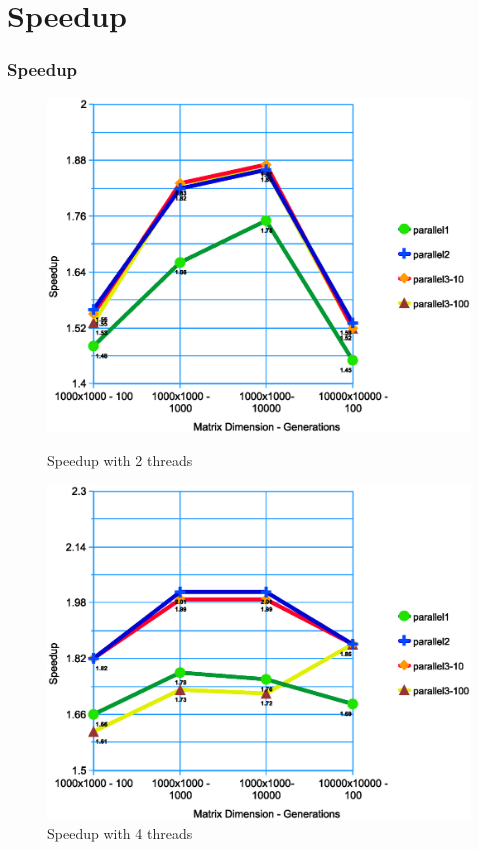 \documentclass{beamer}
\begin{document}
\section{Speedup}
\begin{frame}
	\frametitle{Speedup}
	\begin{figure}
		\centering
		\begin{minipage}{0.5\textwidth}
			\centering
			\includegraphics[width=\linewidth]{../report/2.eps}
			\caption{Speedup with 2 threads}
		\end{minipage}%
		\begin{minipage}{0.5\textwidth}
			\centering
			\includegraphics[width=\linewidth]{../report/4.eps}
			\caption{Speedup with 4 threads}
		\end{minipage}
	\end{figure}
\end{frame}
\end{document}
